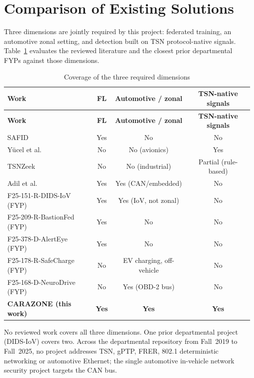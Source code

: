 \section{Comparison of Existing Solutions}
\label{sec:comparison}

Three dimensions are jointly required by this project: federated training, an
automotive zonal setting, and detection built on TSN protocol-native signals.
Table~\ref{tab:dims} evaluates the reviewed literature and the closest prior
departmental FYPs against those dimensions.

\begin{longtable}{p{} c c c}
\caption{Coverage of the three required dimensions}\label{tab:dims}\\
\toprule
\textbf{Work} & \textbf{FL} & \textbf{Automotive / zonal} & \textbf{TSN-native signals} \\
\midrule
\endfirsthead
\toprule
\textbf{Work} & \textbf{FL} & \textbf{Automotive / zonal} & \textbf{TSN-native signals} \\
\midrule
\endhead
SAFID~\cite{adil2026safid}                & Yes & No & No \\
Y\"ucel et al.~\cite{yucel2026icns}      & No  & No (avionics) & Yes \\
TSNZeek~\cite{ergenc2023tsnzeek}              & No  & No (industrial) & Partial (rule-based) \\
Adil et al.~\cite{adil2026embedded}         & Yes & Yes (CAN/embedded) & No \\
F25-151-R-DIDS-IoV (FYP)    & Yes & Yes (IoV, not zonal) & No \\
F25-209-R-BastionFed (FYP)  & Yes & No & No \\
F25-378-D-AlertEye (FYP)    & Yes & No & No \\
F25-178-R-SafeCharge (FYP)  & No  & EV charging, off-vehicle & No \\
F25-168-D-NeuroDrive (FYP)  & No  & Yes (OBD-2 bus) & No \\
\midrule
\textbf{CARAZONE (this work)} & \textbf{Yes} & \textbf{Yes} & \textbf{Yes} \\
\bottomrule
\end{longtable}

No reviewed work covers all three dimensions. One prior departmental project
(DIDS-IoV) covers two. Across the departmental repository from Fall~2019 to
Fall~2025, no project addresses TSN, gPTP, FRER, 802.1 deterministic networking or
automotive Ethernet; the single automotive in-vehicle network security project
targets the CAN bus.

